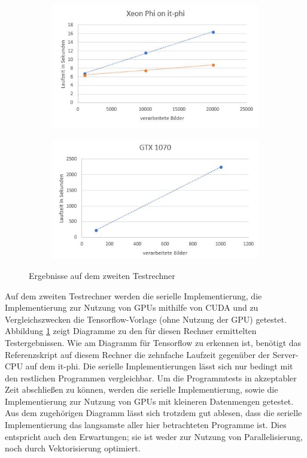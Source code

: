 \documentclass[../main.tex]{subfiles}
\begin{document}
\begin{figure}
	\begin{subfigure}{0.49\textwidth}
		\centering
		\includegraphics[width=\linewidth]{../images/Schmidt/bm_phi_phi.jpg}
	\end{subfigure}%
	\begin{subfigure}{0.49\textwidth}
		\centering
		\includegraphics[width=\linewidth]{../images/Schmidt/bm_gtx_std.jpg}
	\end{subfigure}%
	\caption{Ergebnisse auf dem zweiten Testrechner}
	\label{pics:diagrams_speedtest} 
\end{figure}

Auf dem zweiten Testrechner werden die serielle Implementierung, die Implementierung zur Nutzung von GPUs mithilfe von CUDA und zu Vergleichszwecken die Tensorflow-Vorlage (ohne Nutzung der GPU) getestet. Abbildung \ref{pics:diagrams_speedtest} zeigt Diagramme zu den für diesen Rechner ermittelten Testergebnissen. Wie am Diagramm für Tensorflow zu erkennen ist, benötigt das Referenzskript auf diesem Rechner die zehnfache Laufzeit gegenüber der Server-CPU auf dem it-phi. Die serielle Implementierungen lässt sich nur bedingt mit den restlichen Programmen vergleichbar. Um die Programmtests in akzeptabler Zeit abschließen zu können, werden die serielle Implementierung, sowie die Implementierung zur Nutzung von GPUs mit kleineren Datenmengen getestet. Aus dem zugehörigen Diagramm lässt sich trotzdem gut ablesen, dass die serielle Implementierung das langsamste aller hier betrachteten Programme ist. Dies entspricht auch den Erwartungen; sie ist weder zur Nutzung von Parallelisierung, noch durch Vektorisierung optimiert. 
\end{document}
